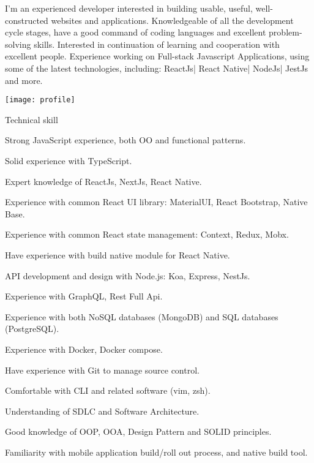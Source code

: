 \documentclass{resume}
\begin{document}

  \noindent\begin{minipage}{0.8\textwidth}%
    I'm an experienced developer interested in building usable, useful, well-constructed websites and applications. 
    Knowledgeable of all the development cycle stages, have a good command of coding languages and excellent problem-solving skills.
    Interested in continuation of learning and cooperation with excellent people.
    Experience working on Full-stack Javascript Applications, using some of the latest technologies, including:
    ReactJs| React Native| NodeJs| JestJs and more.
    \end{minipage}%
    \hfill%
    \begin{minipage}{0.1\textwidth}\raggedright
      \texttt{[image: profile]}
    \end{minipage}

  \begin{rSection}{Technical skill}
    \begin{rSubsection}{}{}{}{}
      \item Strong JavaScript experience, both OO and functional patterns.
      \item Solid experience with TypeScript.
      \item Expert knowledge of ReactJs, NextJs, React Native.
      \item Experience with common React UI library: MaterialUI, React Bootstrap, Native Base.
      \item Experience with common React state management: Context, Redux, Mobx.
      \item Have experience with build native module for React Native.

      \item API development and design with Node.js: Koa, Express, NestJs.
      \item Experience with GraphQL, Rest Full Api.
      \item Experience with both NoSQL databases (MongoDB) and SQL databases (PostgreSQL).
      \item Experience with Docker, Docker compose.

      \item Have experience with Git to manage source control.
      \item Comfortable with CLI and related software (vim, zsh).
      \item Understanding of SDLC and Software Architecture.
      \item Good knowledge of OOP, OOA, Design Pattern and SOLID principles.
      \item Familiarity with mobile application build/roll out process, and native build tool.
    \end{rSubsection}
  \end{rSection}
  
\end{document}
